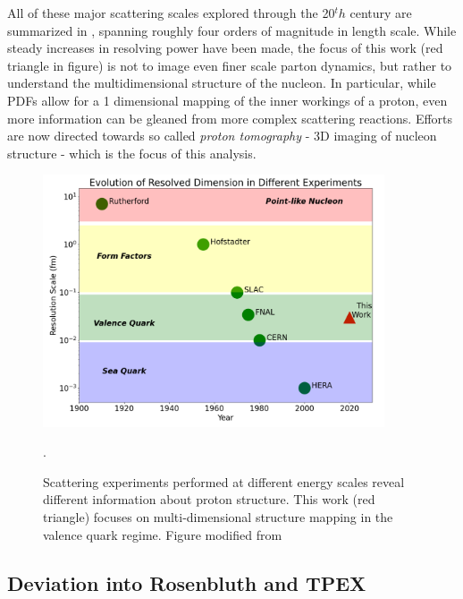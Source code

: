        All of these major scattering scales explored through the 20$^th$ century are summarized in , spanning roughly four orders of magnitude in length scale. While steady increases in resolving power have been made, the focus of this work (red triangle in figure) is not to image even finer scale parton dynamics, but rather to understand the multidimensional structure of the nucleon. In particular, while PDFs allow for a 1 dimensional mapping of the inner workings of a proton, even more information can be gleaned from more complex scattering reactions. Efforts are now directed towards so called \textit{proton tomography} - 3D imaging of nucleon structure - which is the focus of this analysis. 

        \begin{figure}
            \centering
            \includegraphics[width=0.9\textwidth]{Chapters/Ch1-Intro/Ch1-Sec1-Background/pics/experiment_scales.png}
            \caption[Scattering Measurements at Different Scales]{Scattering experiments performed at different energy scales reveal different information about proton structure. This work (red triangle) focuses on multi-dimensional structure mapping in the valence quark regime. Figure modified from \parencite{Klein2005ResolvingHERA}}.
            \label{fig:experimentsVsscale}
        \end{figure}


\clearpage







\iffalse
       \subsection{Deviation into Rosenbluth and TPEX}
        
